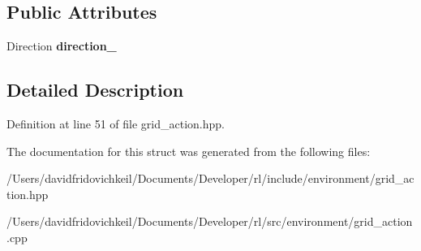 \subsection*{Public Attributes}
\begin{DoxyCompactItemize}
\item 
\hypertarget{structrl_1_1_grid_action_a064e3e1e58eef9d718cd0cadae0318b8}{}\label{structrl_1_1_grid_action_a064e3e1e58eef9d718cd0cadae0318b8} 
Direction {\bfseries direction\+\_\+}
\end{DoxyCompactItemize}


\subsection{Detailed Description}


Definition at line 51 of file grid\+\_\+action.\+hpp.



The documentation for this struct was generated from the following files\+:\begin{DoxyCompactItemize}
\item 
/\+Users/davidfridovichkeil/\+Documents/\+Developer/rl/include/environment/grid\+\_\+action.\+hpp\item 
/\+Users/davidfridovichkeil/\+Documents/\+Developer/rl/src/environment/grid\+\_\+action.\+cpp\end{DoxyCompactItemize}
